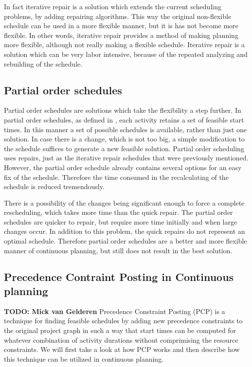 \documentclass{article}
\newcommand{\TODO}[1]{{\color{red}\textbf{TODO: #1}}}
\begin{document}
In fact iterative repair is a solution which extends the current scheduling problems, by adding repairing algorithms.
This way the original non-flexible schedule can be used in a more flexible manner, but it is has not become more flexible.
In other words, iterative repair provides a method of making planning more flexible, although not really making a flexible schedule.
Iterative repair is a solution which can be very labor intensive, because of the repeated analyzing and rebuilding of the schedule.

\subsection{Partial order schedules}
Partial order schedules are solutions which take the flexibility a step further.
In partial order schedules, as defined in \cite{policella07}, each activity retains a set of feasible start times.
In this manner a set of possible schedules is available, rather than just one solution.
In case there is a change, which is not too big, a simple modification to the schedule suffices to generate a new feasible solution.
Partial order scheduling uses repairs, just as the iterative repair schedules that were previously mentioned.
However, the partial order schedule already contains several options for an easy fix of the schedule.
Therefore the time consumed in the recalculating of the schedule is reduced tremendously.

There is a possibility of the changes being significant enough to force a complete rescheduling, which takes more time than the quick repair.
The partial order schedules are quicker to repair, but require more time initially and when large changes occur.
In addition to this problem, the quick repairs do not represent an optimal schedule.
Therefore partial order schedules are a better and more flexible manner of continuous planning, but still does not result in the best solution. 


\subsection{Precedence Contraint Posting in Continuous planning}
\TODO{Mick van Gelderen}
Precedence Constraint Posting (PCP) is a technique for finding feasible schedules by adding new precedence constraints to the original project graph in such a way that start times can be computed for whatever combination of activity durations without comprimising the resource constraints. We will first take a look at how PCP works and then describe how this technique can be utilized in continuous planning. 
\end{document}
